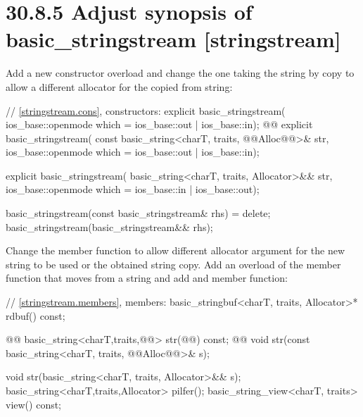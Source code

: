 \documentclass[ebook,11pt,article]{memoir}
\begin{document}
\section{30.8.5 Adjust synopsis of basic\_stringstream [stringstream]}
Add a new constructor overload and change the one taking the string by copy to allow a different allocator for the copied from string:
\begin{codeblock}
    // \ref{stringstream.cons}, constructors:
    explicit basic_stringstream(
      ios_base::openmode which = ios_base::out | ios_base::in);
    @@
    explicit basic_stringstream(
      const basic_string<charT, traits, @@Alloc@@>& str,
      ios_base::openmode which = ios_base::out | ios_base::in);
\end{codeblock}
\begin{addedblock}
\begin{codeblock}
    explicit basic_stringstream(
      basic_string<charT, traits, Allocator>&& str,
      ios_base::openmode which = ios_base::in | ios_base::out);
\end{codeblock}
\end{addedblock}
\begin{codeblock}
    basic_stringstream(const basic_stringstream& rhs) = delete;
    basic_stringstream(basic_stringstream&& rhs);
\end{codeblock}

Change the  member function to allow different allocator argument for the new string to be used or the obtained string copy.
Add an overload of the  member function that moves from a string and add  and  member function:

\begin{codeblock}
    // \ref{stringstream.members}, members:
    basic_stringbuf<charT, traits, Allocator>* rdbuf() const;

    @@
    basic_string<charT,traits,@@> str(@@) const;
    @@
    void str(const basic_string<charT, traits, @@Alloc@@>& s);
\end{codeblock}
\begin{addedblock}
\begin{codeblock}
    void str(basic_string<charT, traits, Allocator>&& s);
    basic_string<charT,traits,Allocator> pilfer();
    basic_string_view<charT, traits> view() const;
\end{codeblock}
\end{addedblock}
\end{document}

